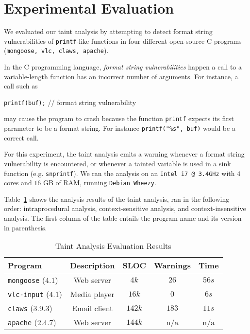 \section{Experimental Evaluation}\label{sec:evaluation}
We evaluated our taint analysis by attempting to detect
format string vulnerabilities of \texttt{printf}-like functions
in four different open-source C programs ({\tt mongoose, vlc,
claws, apache}). 

In the C programming language, \textit{format string vulnerabilities}
happen a call to a variable-length function has an incorrect number
of arguments. For instance, a call such as
\begin{center}
{\tt printf(buf);} // format string vulnerability
\end{center}
may cause the program to crash because the function \texttt{printf}
expects its first parameter to be a format string. For
instance {\tt printf("\%s", buf)} would be a correct call.

For this experiment, the taint analysis emits a warning
whenever a format string vulnerability is encountered,
or whenever a tainted variable is used in a sink function
(e.g. \texttt{snprintf}).
We ran the analysis on an \texttt{Intel i7 @ 3.4GHz} with
$4$ cores and $16$ GB of RAM, running {\tt Debian Wheezy}.

Table~\ref{tab:results} shows the analysis results of the
taint analysis, ran in the following order: intraprocedural
analysis, context-sensitive analysis, and context-insensitive
analysis.
The first column of the table entails the program name and
its version in parenthesis.
\begin{table}[!hbtp]
\centering
\begin{tabular}{|l|c|c|c|c|}
\hline
{\bf Program}				&	{\bf Description}	&	{\bf SLOC}	& {\bf Warnings}	&	{\bf Time}	\\ \hline
{\tt mongoose}	($4.1$)		&	Web server			&	$4k$		&	$26$			&	$56s$ 	\\ %
{\tt vlc-input}	($4.1$)		&	Media player		&	$16k$		&	$0$				&	$6s$ 	\\ %
{\tt claws}		($3.9.3$)	&	Email client		& 	$142k$ 		&	$183$			&	$11s$		\\ %
{\tt apache}	($2.4.7$)	&	Web server			&	$144k$		&	n/a				&	n/a	 		\\ \hline
\end{tabular}\caption{Taint Analysis Evaluation Results}\label{tab:results}
\end{table}

